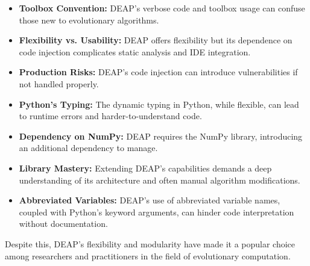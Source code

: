   \begin{itemize}
    \item \textbf{Toolbox Convention:} DEAP's verbose code and toolbox usage 
      can confuse those new to evolutionary algorithms.
    \item \textbf{Flexibility vs. Usability:} DEAP offers flexibility but its 
      dependence on code injection complicates static analysis and IDE 
      integration.
    \item \textbf{Production Risks:} DEAP's code injection can introduce 
      vulnerabilities if not handled properly.
    \item \textbf{Python's Typing:} The dynamic typing in Python, while 
      flexible, can lead to runtime errors and harder-to-understand code.
    \item \textbf{Dependency on NumPy:} DEAP requires the NumPy library, 
      introducing an additional dependency to manage.
    \item \textbf{Library Mastery:} Extending DEAP's capabilities demands a 
      deep understanding of its architecture and often manual algorithm 
      modifications.
    \item \textbf{Abbreviated Variables:} DEAP's use of abbreviated variable 
      names, coupled with Python's keyword arguments, can hinder code 
      interpretation without documentation.
  \end{itemize}

  Despite this, DEAP's flexibility and modularity have made it a popular choice
  among researchers and practitioners in the field of evolutionary computation.
